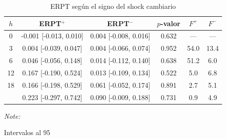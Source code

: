 \begin{table}[!h]
\centering
\caption{ERPT según el signo del shock cambiario}
\centering
\begin{threeparttable}
\begin{tabular}[t]{cccccc}
\toprule
$h$ & ERPT$^{+}$ & ERPT$^{-}$ & $p$-valor & $F^{+}$ & $F^{-}$\\
\midrule
0 & -0.001 [-0.013, 0.010] & 0.004 [-0.008, 0.016] & 0.632 & --- & ---\\
3 & 0.004 [-0.039, 0.047] & 0.004 [-0.066, 0.074] & 0.952 & 54.0 & 13.4\\
6 & 0.046 [-0.056, 0.148] & 0.014 [-0.112, 0.140] & 0.638 & 51.2 & 6.0\\
12 & 0.167 [-0.190, 0.524] & 0.013 [-0.109, 0.134] & 0.522 & 5.0 & 6.8\\
18 & 0.166 [-0.198, 0.529] & 0.061 [-0.052, 0.174] & 0.891 & 2.7 & 5.1\\
\addlinespace
24 & 0.223 [-0.297, 0.742] & 0.090 [-0.009, 0.188] & 0.731 & 0.9 & 4.9\\
\bottomrule
\end{tabular}
\begin{tablenotes}
\item \textit{Note: } 
\item Intervalos al 95%
\end{tablenotes}
\end{threeparttable}
\end{table}